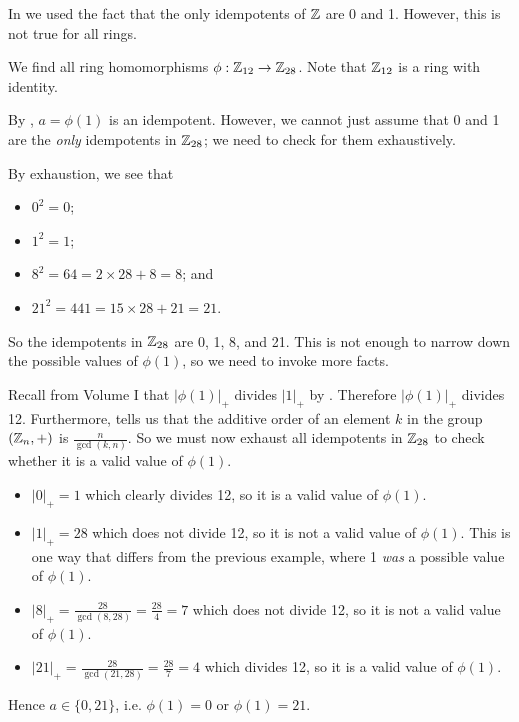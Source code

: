 In  we used the fact that the only idempotents of $\mathbb{Z}$ are 0 and 1. However, this is not true for all rings.

\begin{example}\label{example-homomorphisms-from-Z12-to-Z28}
    We find all ring homomorphisms $\phi: \mathbb{Z}_{12} \to \mathbb{Z}_{28}$. Note that $\mathbb{Z}_{12}$ is a ring with identity.

    By , $a = \phi(1)$ is an idempotent. However, we cannot just assume that 0 and 1 are the \textit{only} idempotents in $\mathbb{Z}_{28}$; we need to check for them exhaustively.

    By exhaustion, we see that
    \begin{itemize}
        \item $0^2 = 0$;
        \item $1^2 = 1$;
        \item $8^2 = 64 = 2 \times 28 + 8 = 8$; and
        \item $21^2 = 441 = 15 \times 28 + 21 = 21$.
    \end{itemize}
    So the idempotents in $\mathbb{Z}_{28}$ are 0, 1, 8, and 21. This is not enough to narrow down the possible values of $\phi(1)$, so we need to invoke more facts.

    Recall from Volume I that $|\phi(1)|_+$ divides $|1|_+$ by . Therefore $|\phi(1)|_+$ divides 12. Furthermore,  tells us that the additive order of an element $k$ in the group $(\mathbb{Z}_n, +)$ is $\frac{n}{\gcd(k,n)}$. So we must now exhaust all idempotents in $\mathbb{Z}_{28}$ to check whether it is a valid value of $\phi(1)$.
    \begin{itemize}
        \item $|0|_+ = 1$ which clearly divides 12, so it is a valid value of $\phi(1)$.
        \item $|1|_+ = 28$ which does not divide 12, so it is not a valid value of $\phi(1)$. This is one way that differs from the previous example, where 1 \textit{was} a possible value of $\phi(1)$.
        \item $|8|_+ = \frac{28}{\gcd(8,28)} = \frac{28}4 = 7$ which does not divide 12, so it is not a valid value of $\phi(1)$.
        \item $|21|_+ = \frac{28}{\gcd(21,28)} = \frac{28}7 = 4$ which divides 12, so it is a valid value of $\phi(1)$.
    \end{itemize}
    Hence $a \in \{0, 21\}$, i.e. $\phi(1) = 0$ or $\phi(1) = 21$.


\end{example}
